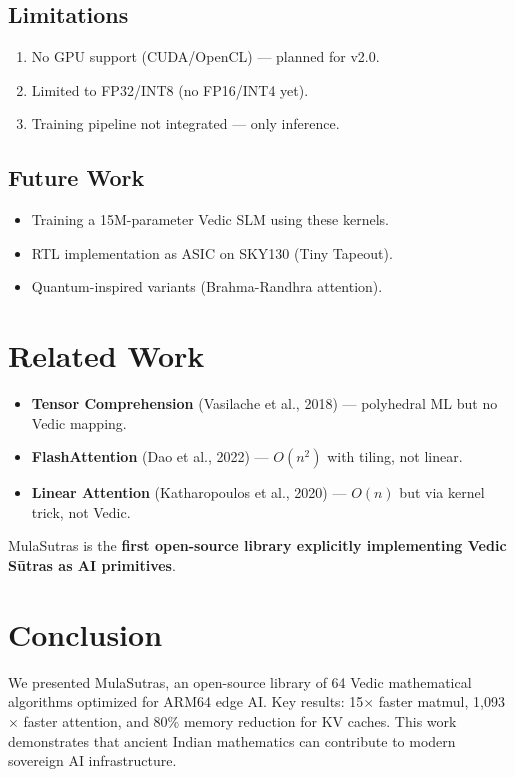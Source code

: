 \documentclass[12pt, a4paper]{article}
\begin{document}
\subsection{Limitations}
\begin{enumerate}
    \item No GPU support (CUDA/OpenCL) — planned for v2.0.
    \item Limited to FP32/INT8 (no FP16/INT4 yet).
    \item Training pipeline not integrated — only inference.
\end{enumerate}

\subsection{Future Work}
\begin{itemize}
    \item Training a 15M-parameter Vedic SLM using these kernels.
    \item RTL implementation as ASIC on SKY130 (Tiny Tapeout).
    \item Quantum-inspired variants (Brahma-Randhra attention).
\end{itemize}

\section{Related Work}
\begin{itemize}
    \item \textbf{Tensor Comprehension} (Vasilache et al., 2018) — polyhedral ML but no Vedic mapping.
    \item \textbf{FlashAttention} (Dao et al., 2022) — $O(n^2)$ with tiling, not linear.
    \item \textbf{Linear Attention} (Katharopoulos et al., 2020) — $O(n)$ but via kernel trick, not Vedic.
\end{itemize}
MulaSutras is the \textbf{first open-source library explicitly implementing Vedic S\={u}tras as AI primitives}.

\section{Conclusion}
We presented MulaSutras, an open-source library of 64 Vedic mathematical algorithms optimized for ARM64 edge AI. Key results: 15$\times$ faster matmul, 1,093$\times$ faster attention, and 80\% memory reduction for KV caches. This work demonstrates that ancient Indian mathematics can contribute to modern sovereign AI infrastructure.
\end{document}

